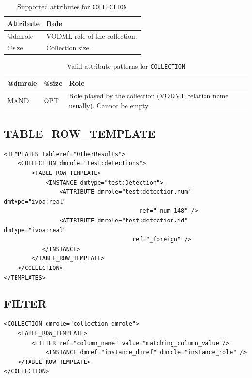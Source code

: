 \documentclass[11pt,a4paper]{ivoa}
\begin{document}
\begin{table}[!htbp]
     \begin{tabular}{|p{1.5cm}|p{10.5cm}|}
       \hline Attribute & Role\\
       \hline  
      @dmrole    & VODML role of the collection.\\       
       \hline  
      @size    & Collection size.\\       
       \hline 
     \end{tabular}
     \caption{Supported attributes for  \texttt{COLLECTION}} 
     \label{tbl:att-att}
 \end{table}


\begin{table}[!htbp]
  \begin{tabular}{|p{1.5cm}|p{1.5cm}|p{6cm}|}
    \hline @dmrole   & @size   &  Role\\
    \hline  MAND & OPT & Role played by the collection (VODML relation name usually). Cannot be empty \\    
    \hline 
  \end{tabular}
  \caption{Valid attribute patterns for  \texttt{COLLECTION}} 
  \label{tbl:coll-pattern}
 \end{table}


\subsection{TABLE\_ROW\_TEMPLATE}

\begin{lstlisting}[caption={TABLE\_ROW\_TEMPLATE examples},captionpos=b]
<TEMPLATES tableref="OtherResults">
    <COLLECTION dmrole="test:detections">
        <TABLE_ROW_TEMPLATE>
            <INSTANCE dmtype="test:Detection">
                <ATTRIBUTE dmrole="test:detection.num" dmtype="ivoa:real"
                                       ref="_num_148" />
                <ATTRIBUTE dmrole="test:detection.id" dmtype="ivoa:real"
                                     ref="_foreign" />
           </INSTANCE>
        </TABLE_ROW_TEMPLATE>
    </COLLECTION>
</TEMPLATES>
\end{lstlisting}

\subsection{FILTER}

\begin{lstlisting}[caption={FILTER examples},captionpos=b]
<COLLECTION dmrole="collection_dmrole">
    <TABLE_ROW_TEMPLATE>
        <FILTER ref="column_name" value="matching_column_value"/>
            <INSTANCE dmref="instance_dmref" dmrole="instance_role" />
    </TABLE_ROW_TEMPLATE>
</COLLECTION>
\end{lstlisting}
\end{document}
